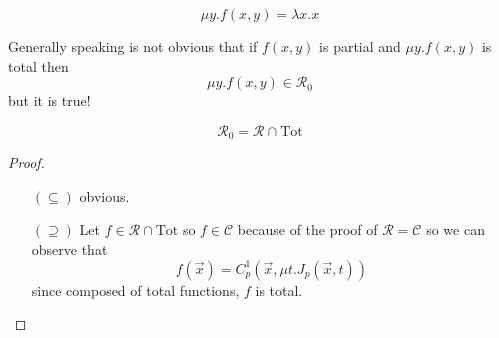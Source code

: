 \[
  \mu y . f(x,y) = \lambda x . x 
\]

Generally speaking is not obvious that if $f(x,y)$ is partial and
$\mu y . f(x,y)$ is total then \[\mu y . f(x,y) \in \mathcal{R}_0\]
but it is true!

\begin{theorem}
  \[\mathcal{R}_0 = \mathcal{R}\cap \text{Tot}\]
  \begin{proof}
    \begin{enumerate}
    \item[$(\subseteq)$] obvious.
    \item[$(\supseteq)$] Let $f \in \mathcal{R} \cap \text{Tot}$ so
      $f \in \mathcal{C}$ because of the proof of $\mathcal{R = C}$ so
      we can observe that
      \[f(\vec{x}) = C_p^1 ( \vec{x} , \mu t . J_p(\vec{x}, t))\]
      since composed of total functions, $f$ is total.
    \end{enumerate}
  \end{proof}
\end{theorem}
